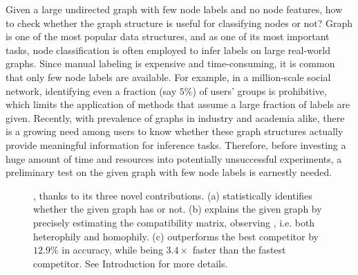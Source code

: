 Given a large undirected graph with few node labels and no node features, how to check whether the graph structure is useful for classifying nodes or not? 
Graph is one of the most popular data structures, and as one of its most important tasks, node classification is often employed to infer labels on large real-world graphs.
Since manual labeling is expensive and time-consuming, it is common that only few node labels are available.
For example, in a million-scale social network, identifying even a fraction (say $5\%$) of users' groups is prohibitive, which limits the application of methods that assume a large fraction of labels are given.
Recently, with prevalence of graphs in industry and academia alike, there is a growing need among users to know whether these graph structures actually provide meaningful information for inference tasks.
Therefore, before investing a huge amount of time and resources into potentially unsuccessful experiments, a preliminary test on the given graph with few node labels is earnestly needed.

\begin{figure*}[t]
\centering
\captionsetup[subfloat]{captionskip=-1pt}
\subfloat[\label{fig:c2} \methodest: \explain\xspace and \general]
{\texttt{[image: FIG/ne\_est.pdf]}}
{}
\vspace{-2mm}
\caption{\label{fig:crown} \underline{}, thanks to its three novel contributions.
(a) \methodtest statistically identifies whether the given graph has \nef or not.
(b) \methodest explains the given graph by precisely estimating the compatibility matrix, observing \xophily, i.e. both heterophily and homophily. 
(c) \methodexp outperforms the best competitor by $12.9\%$ in accuracy, while being $3.4\times$ faster than the fastest competitor.
See Introduction for more details.
}
\end{figure*}

